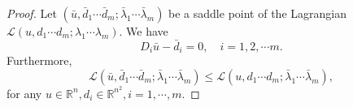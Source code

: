 \documentclass{article}
\theoremstyle{definition}
\begin{document}
\begin{proof}

Let $(\bar{u},\bar{d}_1\cdots \bar{d}_m;\bar{\lambda}_1\cdots \bar{\lambda}_m)$ be a saddle point of the Lagrangian $\mathcal{L}(u,d_1\cdots d_m;\lambda_1\cdots \lambda_m)$.
We have
\begin{equation}\label{eq:3.12}
  D_i\bar{u}-\bar{d}_i=0, \quad  i=1,2,\cdots m.
\end{equation}
Furthermore,
\begin{equation}\label{eq:3.11}
  \mathcal{L}(\bar{u},\bar{d}_1\cdots \bar{d}_m;\bar{\lambda}_1\cdots \bar{\lambda}_m)
  \leq \mathcal{L}({u},{d}_1 \cdots {d}_m;\bar{\lambda}_1\cdots \bar{\lambda}_m),
\end{equation}
for any $u\in\mathbb{R}^n, d_i\in\mathbb{R}^{n^2}, i=1,\cdots,m$.



\end{proof}
\end{document}
